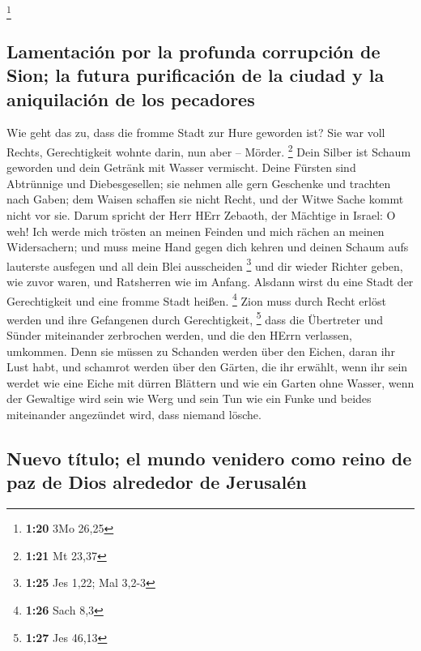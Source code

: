\footnote{\textbf{1:20} 3Mo 26,25}

\hypertarget{lamentaciuxf3n-por-la-profunda-corrupciuxf3n-de-sion-la-futura-purificaciuxf3n-de-la-ciudad-y-la-aniquilaciuxf3n-de-los-pecadores}{%
\subsection{Lamentación por la profunda corrupción de Sion; la futura
purificación de la ciudad y la aniquilación de los
pecadores}\label{lamentaciuxf3n-por-la-profunda-corrupciuxf3n-de-sion-la-futura-purificaciuxf3n-de-la-ciudad-y-la-aniquilaciuxf3n-de-los-pecadores}}

 Wie geht das zu, dass die fromme Stadt zur Hure geworden
ist? Sie war voll Rechts, Gerechtigkeit wohnte darin, nun aber --
Mörder. \footnote{\textbf{1:21} Mt 23,37}  Dein Silber
ist Schaum geworden und dein Getränk mit Wasser vermischt.
 Deine Fürsten sind Abtrünnige und Diebesgesellen; sie
nehmen alle gern Geschenke und trachten nach Gaben; dem Waisen schaffen
sie nicht Recht, und der Witwe Sache kommt nicht vor sie.
 Darum spricht der Herr HErr Zebaoth, der Mächtige in
Israel: O weh! Ich werde mich trösten an meinen Feinden und mich rächen
an meinen Widersachern;  und muss meine Hand gegen dich
kehren und deinen Schaum aufs lauterste ausfegen und all dein Blei
ausscheiden \footnote{\textbf{1:25} Jes 1,22; Mal 3,2-3} 
und dir wieder Richter geben, wie zuvor waren, und Ratsherren wie im
Anfang. Alsdann wirst du eine Stadt der Gerechtigkeit und eine fromme
Stadt heißen. \footnote{\textbf{1:26} Sach 8,3}  Zion
muss durch Recht erlöst werden und ihre Gefangenen durch Gerechtigkeit,
\footnote{\textbf{1:27} Jes 46,13}  dass die Übertreter
und Sünder miteinander zerbrochen werden, und die den HErrn verlassen,
umkommen.  Denn sie müssen zu Schanden werden über den
Eichen, daran ihr Lust habt, und schamrot werden über den Gärten, die
ihr erwählt,  wenn ihr sein werdet wie eine Eiche mit
dürren Blättern und wie ein Garten ohne Wasser,  wenn der
Gewaltige wird sein wie Werg und sein Tun wie ein Funke und beides
miteinander angezündet wird, dass niemand lösche.

\hypertarget{nuevo-tuxedtulo-el-mundo-venidero-como-reino-de-paz-de-dios-alrededor-de-jerusaluxe9n}{%
\subsection{Nuevo título; el mundo venidero como reino de paz de Dios
alrededor de
Jerusalén}\label{nuevo-tuxedtulo-el-mundo-venidero-como-reino-de-paz-de-dios-alrededor-de-jerusaluxe9n}}

